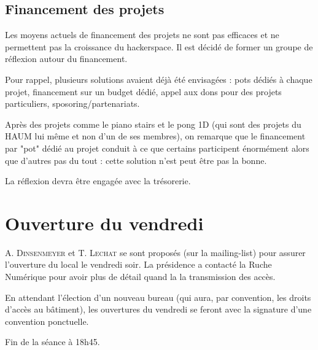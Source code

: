 \documentclass[a4paper, 11pt]{article}
\begin{document}
	\subsection{Financement des projets}

	Les moyens actuels de financement des projets ne sont pas efficaces et ne permettent pas la croissance du
	hackerspace. Il est décidé de former un groupe de réflexion autour du financement.

	Pour rappel, plusieurs solutions avaient déjà été envisagées : pots dédiés à chaque projet, financement sur un
	budget dédié, appel aux dons pour des projets particuliers, sposoring/partenariats.

	Après des projets comme le piano stairs et le pong 1D (qui sont des projets du HAUM lui même et non d'un de ses
	membres), on remarque que le financement par "pot" dédié au projet conduit à ce que certains participent énormément
	alors que d'autres pas du tout : cette solution n'est peut être pas la bonne.

	La réflexion devra être engagée avec la trésorerie.

	\section{Ouverture du vendredi}

	A. \textsc{Dinsenmeyer} et T. \textsc{Lechat} se sont proposés (sur la mailing-list) pour assurer l'ouverture du
	local le vendredi soir. La présidence a contacté la Ruche Numérique pour avoir plus de détail quand la la
	transmission des accès.

	En attendant l'élection d'un nouveau bureau (qui aura, par convention, les droits d'accès au bâtiment), les
	ouvertures du vendredi se feront avec la signature d'une convention ponctuelle.


	\bigskip

	Fin de la séance à 18h45.

	\bigskip
\end{document}
